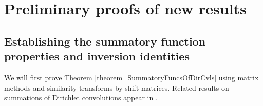 \documentclass[11pt,reqno,a4letter]{article}
\numberwithin{figure}{section}
\numberwithin{table}{section}
\newcommand{\cf}{\textit{cf.\ }}
\theoremstyle{plain}
\numberwithin{theorem}{section}
\theoremstyle{definition}
\begin{document}
\newpage 
\section{Preliminary proofs of new results} 
\label{Section_PrelimProofs_Config} 

\subsection{Establishing the summatory function properties and inversion identities} 

We will first prove Theorem \ref{theorem_SummatoryFuncsOfDirCvls} 
using matrix methods and similarity transforms by shift matrices. 
Related results on summations of Dirichlet convolutions appear in 
\cite[\S 2.14; \S 3.10; \S 3.12; \cf \S 4.9, p.\ 95]{APOSTOLANUMT}. 
\end{document}
